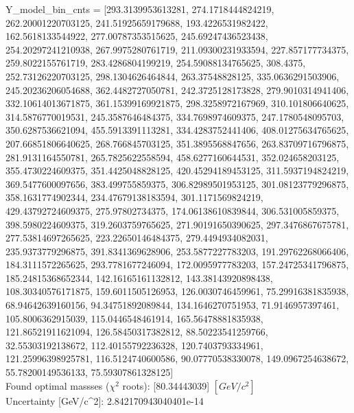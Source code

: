 \documentclass[12pt]{article}
\begin{document}
	Y\_model\_bin\_cnts = [293.3139953613281, 274.1718444824219, 262.20001220703125, 241.51925659179688, 193.4226531982422, 162.5618133544922, 277.00787353515625, 245.69247436523438, 254.20297241210938, 267.9975280761719, 211.09300231933594, 227.857177734375, 259.8022155761719, 283.4286804199219, 254.59088134765625, 308.4375, 252.73126220703125, 298.1304626464844, 263.37548828125, 335.0636291503906, 245.20236206054688, 362.4482727050781, 242.3725128173828, 279.9010314941406, 332.10614013671875, 361.15399169921875, 298.3258972167969, 310.101806640625, 314.5876770019531, 245.3587646484375, 334.7698974609375, 247.1780548095703, 350.6287536621094, 455.5913391113281, 334.4283752441406, 408.01275634765625, 207.66851806640625, 268.766845703125, 351.3895568847656, 263.83709716796875, 281.9131164550781, 265.7825622558594, 458.6277160644531, 352.024658203125, 355.4730224609375, 351.4425048828125, 420.45294189453125, 311.5937194824219, 369.5477600097656, 383.499755859375, 306.82989501953125, 301.08123779296875, 358.1631774902344, 234.47679138183594, 301.1171569824219, 429.43792724609375, 275.97802734375, 174.06138610839844, 306.531005859375, 398.5980224609375, 319.2603759765625, 271.90191650390625, 297.3476867675781, 277.53814697265625, 223.22650146484375, 279.4494934082031, 235.9373779296875, 391.8341369628906, 253.5877227783203, 191.29762268066406, 184.3111572265625, 293.7781677246094, 172.0095977783203, 157.24725341796875, 185.24815368652344, 142.16165161132812, 143.38143920898438, 108.30340576171875, 159.6011505126953, 126.0030746459961, 75.29916381835938, 68.94642639160156, 94.34751892089844, 134.1646270751953, 71.9146957397461, 105.8006362915039, 115.0446548461914, 165.56478881835938, 121.86521911621094, 126.58450317382812, 88.50223541259766, 32.55303192138672, 112.40155792236328, 120.7403793334961, 121.25996398925781, 116.5124740600586, 90.07770538330078, 149.0967254638672, 55.78200149536133, 75.59307861328125]\\

    Found optimal massses ($\chi^2$ roots): [80.34443039] $[GeV/c^{2}]$\\
    Uncertainty [GeV/c^2]: 2.842170943040401e-14\\
\end{document}
